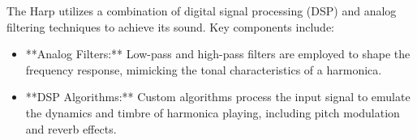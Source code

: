 The Harp utilizes a combination of digital signal processing (DSP) and analog filtering techniques to achieve its sound. Key components include:
\begin{itemize}
\item **Analog Filters:** Low-pass and high-pass filters are employed to shape the frequency response, mimicking the tonal characteristics of a harmonica.
\item **DSP Algorithms:** Custom algorithms process the input signal to emulate the dynamics and timbre of harmonica playing, including pitch modulation and reverb effects.
\end{itemize}
